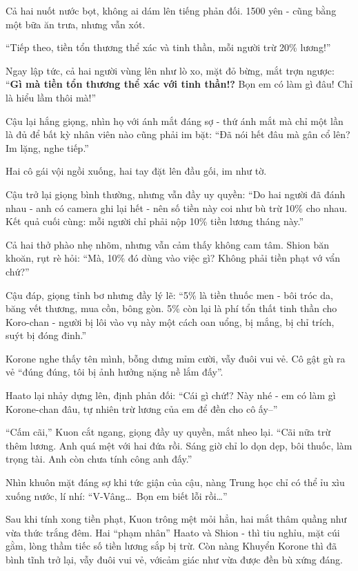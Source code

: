 \documentclass[../main.tex]{subfiles}
\begin{document}
Cả hai nuốt nước bọt, không ai dám lên tiếng phản đối. 1500 yên - cũng bằng một bữa ăn trưa, nhưng vẫn xót.

``Tiếp theo, tiền tổn thương thể xác và tinh thần, mỗi người trừ 20\% lương!''

Ngay lập tức, cả hai người vùng lên như lò xo, mặt đỏ bừng, mắt trợn ngược: ``\textbf{Gì mà tiền tổn thương thể xác với tinh thần!?} Bọn em có làm gì đâu! Chỉ là hiểu lầm thôi mà!''

Cậu lại hắng giọng, nhìn họ với ánh mắt đáng sợ - thứ ánh mắt mà chỉ một lần là đủ để bất kỳ nhân viên nào cũng phải im bặt: ``Đã nói hết đâu mà gân cổ lên? Im lặng, nghe tiếp.''

Hai cô gái vội ngồi xuống, hai tay đặt lên đầu gối, im như tờ.

Cậu trở lại giọng bình thường, nhưng vẫn đầy uy quyền: ``Do hai người đã đánh nhau - anh có camera ghi lại hết - nên số tiền này coi như bù trừ 10\% cho nhau. Kết quả cuối cùng: mỗi người chỉ phải nộp 10\% tiền lương tháng này.''

Cả hai thở phào nhẹ nhõm, nhưng vẫn cảm thấy không cam tâm. Shion băn khoăn, rụt rè hỏi: ``Mà, 10\% đó dùng vào việc gì? Không phải tiền phạt vớ vẩn chứ?''

Cậu đáp, giọng tỉnh bơ nhưng đầy lý lẽ: ``5\% là tiền thuốc men - bôi tróc da, băng vết thương, mua cồn, bông gòn. 5\% còn lại là phí tổn thất tinh thần cho Koro-chan - người bị lôi vào vụ này một cách oan uổng, bị mắng, bị chỉ trích, suýt bị đóng đinh.''

Korone nghe thấy tên mình, bỗng dưng mỉm cười, vẫy đuôi vui vẻ. Cô gật gù ra vẻ ``đúng đúng, tôi bị ảnh hưởng nặng nề lắm đấy''.

Haato lại nhảy dựng lên, định phản đối: ``Cái gì chứ!? Này nhé - em có làm gì Korone-chan đâu, tự nhiên trừ lương của em để đền cho cô ấy--''

``Cấm cãi,''  Kuon cắt ngang, giọng đầy uy quyền, mắt nheo lại. ``Cãi nữa trừ thêm lương. Anh quá mệt với hai đứa rồi. Sáng giờ chỉ lo dọn dẹp, bôi thuốc, làm trọng tài. Anh còn chưa tính công anh đấy.''

Nhìn khuôn mặt đáng sợ khi tức giận của cậu, nàng Trung học chỉ có thể ỉu xìu xuống nước, lí nhí: ``V-Vâng\dots\ Bọn em biết lỗi rồi\dots''

Sau khi tính xong tiền phạt, Kuon trông mệt mỏi hẳn, hai mắt thâm quầng như vừa thức trắng đêm. Hai ``phạm nhân''  Haato và Shion - thì tiu nghỉu, mặt cúi gằm, lòng thầm tiếc số tiền lương sắp bị trừ. Còn nàng Khuyển Korone thì đã bình tĩnh trở lại, vẫy đuôi vui vẻ, vớicảm giác như vừa được đền bù xứng đáng.
\end{document}
